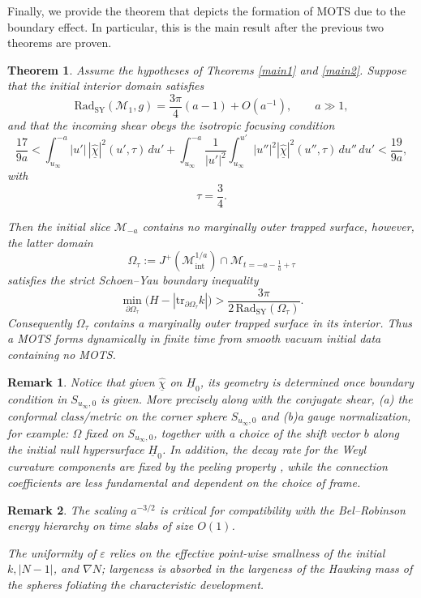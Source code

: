 \documentclass{amsart}
\newtheorem{remark}{Remark}
\newtheorem{theorem}{Theorem}[section]
\newcommand{\Hbar}{\underline{H}}
\newcommand{\chibarhat}{\underline{\hat{\chi}}}
\newcommand{\tr}{\mbox{tr}}
\begin{document}
\noindent Finally, we provide the theorem that depicts the formation of MOTS due to the boundary effect. In particular, this is the main result after the previous two theorems are proven. 

\begin{theorem}
\label{main3}
Assume the hypotheses of Theorems
\ref{main1} and \ref{main2}.  Suppose
that the initial interior domain satisfies
\[
\text{Rad}_{\mathrm{SY}}(\mathcal M_{1},g)
=
\frac{3\pi}{4}(a-1)+O(a^{-1}),
\qquad
a\gg1,
\]
and that the incoming shear obeys the isotropic focusing condition
\[
\frac{17}{9a}
<
\int_{u_{\infty}}^{-a}
|u'|\,|\underline{\hat\chi}|^{2}(u',\tau)\,du'
+
\int_{u_{\infty}}^{-a}
\frac{1}{|u'|^{2}}
\int_{u_{\infty}}^{u'}
|u''|^{2}|\underline{\hat\chi}|^{2}(u'',\tau)\,du''\,du'
<
\frac{19}{9a},
\]
with
\[
\tau=\frac34.
\]

\noindent Then the initial slice \(\mathcal M_{-a}\) contains no marginally outer trapped
surface, however, the latter domain
\[
\Omega_{\tau}
:=
J^{+}(\mathcal M_{\mathrm{int}}^{1/a})
\cap
\mathcal M_{t=-a-\frac1a+\tau}
\]
satisfies the strict Schoen--Yau boundary inequality
\[
\min_{\partial\Omega_{\tau}}
\bigl(H-|\tr_{\partial\Omega_{\tau}}k|\bigr)
>
\frac{3\pi}{2\,\text{Rad}_{\mathrm{SY}}(\Omega_{\tau})}.
\]
Consequently \(\Omega_{\tau}\) contains a marginally outer trapped surface in
its interior.  Thus a MOTS forms dynamically in finite time from smooth vacuum
initial data containing no MOTS.
\end{theorem}

\begin{remark}
Notice that given $\chibarhat$ on $\Hbar_{0}$, its geometry is determined once boundary condition in $S_{u_{\infty},0}$ is given. More precisely along with the conjugate shear, (a) the conformal class/metric on the corner sphere $S_{u_\infty,0}$ and (b)a gauge normalization, for example:
$\Omega$  fixed on $S_{u_\infty,0}$, together with a choice of the shift vector $b$ along the initial null hypersurface $\Hbar_{0}$.  In addition, the decay rate for the Weyl curvature components are fixed by the peeling property \cite{nicolo}, while the connection coefficients are less fundamental and dependent on the choice of frame.    
\end{remark}

\begin{remark} The scaling $a^{-3/2}$ is critical for compatibility with the Bel--Robinson energy hierarchy on time slabs of size $O(1)$.
\item The uniformity of $\varepsilon$ relies on the effective point-wise smallness of the initial $k,|N-1|$, and $\nabla N$; largeness is absorbed in the largeness of the Hawking mass of the spheres foliating the characteristic development.
\end{remark}
\end{document}
